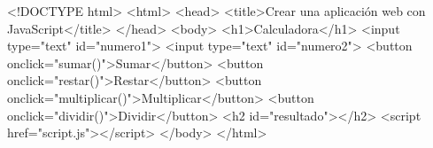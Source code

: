 \documentclass[
  a4paper,
  DIV=11,
  numbers=noendperiod,
  onepage,
  openany]{scrreprt}
\newenvironment{Shaded}{\begin{snugshade}}{\end{snugshade}}
\newcommand{\DataTypeTok}[1]{\textcolor[rgb]{0.68,0.00,0.00}{#1}}
\newcommand{\KeywordTok}[1]{\textcolor[rgb]{0.00,0.23,0.31}{#1}}
\newcommand{\NormalTok}[1]{\textcolor[rgb]{0.00,0.23,0.31}{#1}}
\newcommand{\OperatorTok}[1]{\textcolor[rgb]{0.37,0.37,0.37}{#1}}
\newcommand{\OtherTok}[1]{\textcolor[rgb]{0.00,0.23,0.31}{#1}}
\newcommand{\StringTok}[1]{\textcolor[rgb]{0.13,0.47,0.30}{#1}}
\begin{document}
\begin{Shaded}
\begin{Highlighting}[]

\DataTypeTok{\textless{}!DOCTYPE }\NormalTok{html}\DataTypeTok{\textgreater{}}
\DataTypeTok{\textless{}}\KeywordTok{html}\DataTypeTok{\textgreater{}}
\DataTypeTok{\textless{}}\KeywordTok{head}\DataTypeTok{\textgreater{}}
    \DataTypeTok{\textless{}}\KeywordTok{title}\DataTypeTok{\textgreater{}}\NormalTok{Crear una aplicación web con JavaScript}\DataTypeTok{\textless{}/}\KeywordTok{title}\DataTypeTok{\textgreater{}}
\DataTypeTok{\textless{}/}\KeywordTok{head}\DataTypeTok{\textgreater{}}
\DataTypeTok{\textless{}}\KeywordTok{body}\DataTypeTok{\textgreater{}}
    \DataTypeTok{\textless{}}\KeywordTok{h1}\DataTypeTok{\textgreater{}}\NormalTok{Calculadora}\DataTypeTok{\textless{}/}\KeywordTok{h1}\DataTypeTok{\textgreater{}}
    \DataTypeTok{\textless{}}\KeywordTok{input}\OtherTok{ type}\OperatorTok{=}\StringTok{"text"}\OtherTok{ id}\OperatorTok{=}\StringTok{"numero1"}\DataTypeTok{\textgreater{}}
    \DataTypeTok{\textless{}}\KeywordTok{input}\OtherTok{ type}\OperatorTok{=}\StringTok{"text"}\OtherTok{ id}\OperatorTok{=}\StringTok{"numero2"}\DataTypeTok{\textgreater{}}
    \DataTypeTok{\textless{}}\KeywordTok{button}\OtherTok{ onclick}\OperatorTok{=}\StringTok{"sumar()"}\DataTypeTok{\textgreater{}}\NormalTok{Sumar}\DataTypeTok{\textless{}/}\KeywordTok{button}\DataTypeTok{\textgreater{}}
    \DataTypeTok{\textless{}}\KeywordTok{button}\OtherTok{ onclick}\OperatorTok{=}\StringTok{"restar()"}\DataTypeTok{\textgreater{}}\NormalTok{Restar}\DataTypeTok{\textless{}/}\KeywordTok{button}\DataTypeTok{\textgreater{}}
    \DataTypeTok{\textless{}}\KeywordTok{button}\OtherTok{ onclick}\OperatorTok{=}\StringTok{"multiplicar()"}\DataTypeTok{\textgreater{}}\NormalTok{Multiplicar}\DataTypeTok{\textless{}/}\KeywordTok{button}\DataTypeTok{\textgreater{}}
    \DataTypeTok{\textless{}}\KeywordTok{button}\OtherTok{ onclick}\OperatorTok{=}\StringTok{"dividir()"}\DataTypeTok{\textgreater{}}\NormalTok{Dividir}\DataTypeTok{\textless{}/}\KeywordTok{button}\DataTypeTok{\textgreater{}}
    \DataTypeTok{\textless{}}\KeywordTok{h2}\OtherTok{ id}\OperatorTok{=}\StringTok{"resultado"}\DataTypeTok{\textgreater{}\textless{}/}\KeywordTok{h2}\DataTypeTok{\textgreater{}}
    \DataTypeTok{\textless{}}\KeywordTok{script}\OtherTok{ href}\OperatorTok{=}\StringTok{"script.js"}\DataTypeTok{\textgreater{}\textless{}/}\KeywordTok{script}\DataTypeTok{\textgreater{}}
\DataTypeTok{\textless{}/}\KeywordTok{body}\DataTypeTok{\textgreater{}}
\DataTypeTok{\textless{}/}\KeywordTok{html}\DataTypeTok{\textgreater{}}
\end{Highlighting}
\end{Shaded}
\end{document}
